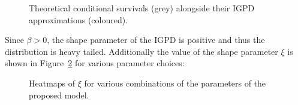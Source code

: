 \documentclass[
  sn-basic,
]{sn-jnl}
\theoremstyle{plain}
\theoremstyle{remark}
\begin{document}
\begin{figure}[H]


\caption{\label{fig-approx_surv}Theoretical conditional survivals (grey)
alongside their IGPD approximations (coloured).}

\end{figure}%

Since \(\beta>0\), the shape parameter of the IGPD is positive and thus
the distribution is heavy tailed. Additionally the value of the shape
parameter \(\xi\) is shown in Figure~\ref{fig-polyheat} for various
parameter choices:

\begin{figure}[H]


\caption{\label{fig-polyheat}Heatmaps of \(\xi\) for various
combinations of the parameters of the proposed model.}

\end{figure}%
\end{document}
